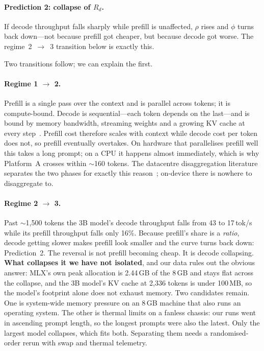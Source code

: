 \documentclass[sigconf,nonacm,10pt]{acmart}
\begin{document}
\paragraph{Prediction 2: collapse of $R_d$.} If decode throughput falls sharply while prefill is unaffected,
$\rho$ rises and $\phi$ turns back down---not because prefill got cheaper, but because decode got worse.
The regime~2~$\rightarrow$~3 transition below is exactly this.

Two transitions follow; we can explain the first.

\paragraph{Regime 1 $\rightarrow$ 2.} Prefill is a single pass over the context and is parallel across tokens;
it is compute-bound. Decode is sequential---each token depends on the last---and is bound by memory bandwidth,
streaming weights and a growing KV cache at every
step~\cite{kwon2023pagedattention,agrawal2024sarathi}. Prefill cost therefore scales with context while decode
cost per token does not, so prefill eventually overtakes. On hardware that parallelises prefill well this takes
a long prompt; on a CPU it happens almost immediately, which is why Platform~A crosses within $\sim$160 tokens.
The datacentre disaggregation literature separates the two phases for exactly this
reason~\cite{patel2024splitwise,zhong2024distserve}; on-device there is nowhere to disaggregate to.

\paragraph{Regime 2 $\rightarrow$ 3.} Past $\sim$1{,}500 tokens the 3B model's decode throughput falls from 43
to 17\,tok/s while its prefill throughput falls only 16\%. Because prefill's share is a \emph{ratio}, decode
getting slower makes prefill look smaller and the curve turns back down: Prediction~2. The reversal is not
prefill becoming cheap. It is decode collapsing. \textbf{What collapses it we have not isolated}, and our data
rules out the obvious answer: MLX's own peak allocation is 2.44\,GB of the 8\,GB and stays flat across the
collapse, and the 3B model's KV cache at 2{,}336 tokens is under 100\,MB, so the model's footprint alone does
not exhaust memory. Two candidates remain. One is system-wide memory pressure on an 8\,GB machine that also
runs an operating system. The other is thermal limits on a fanless chassis: our runs went in ascending prompt
length, so the longest prompts were also the latest. Only the largest model collapses, which fits both.
Separating them needs a randomised-order rerun with swap and thermal telemetry.
\end{document}
